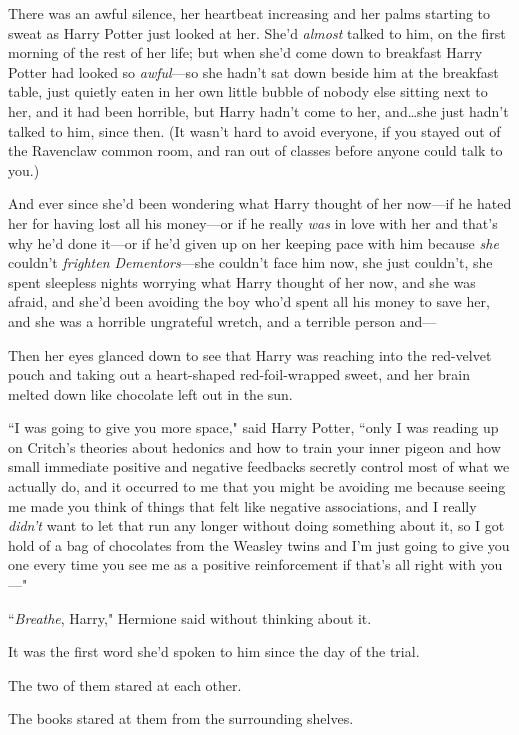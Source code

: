There was an awful silence, her heartbeat increasing and her palms starting to sweat as Harry Potter just looked at her. She'd \emph{almost} talked to him, on the first morning of the rest of her life; but when she'd come down to breakfast Harry Potter had looked so \emph{awful}—so she hadn't sat down beside him at the breakfast table, just quietly eaten in her own little bubble of nobody else sitting next to her, and it had been horrible, but Harry hadn't come to her, and…she just hadn't talked to him, since then. (It wasn't hard to avoid everyone, if you stayed out of the Ravenclaw common room, and ran out of classes before anyone could talk to you.)

And ever since she'd been wondering what Harry thought of her now—if he hated her for having lost all his money—or if he really \emph{was} in love with her and that's why he'd done it—or if he'd given up on her keeping pace with him because \emph{she} couldn't \emph{frighten Dementors}—she couldn't face him now, she just couldn't, she spent sleepless nights worrying what Harry thought of her now, and she was afraid, and she'd been avoiding the boy who'd spent all his money to save her, and she was a horrible ungrateful wretch, and a terrible person and—

Then her eyes glanced down to see that Harry was reaching into the red-velvet pouch and taking out a heart-shaped red-foil-wrapped sweet, and her brain melted down like chocolate left out in the sun.

``I was going to give you more space," said Harry Potter, ``only I was reading up on Critch's theories about hedonics and how to train your inner pigeon and how small immediate positive and negative feedbacks secretly control most of what we actually do, and it occurred to me that you might be avoiding me because seeing me made you think of things that felt like negative associations, and I really \emph{didn't} want to let that run any longer without doing something about it, so I got hold of a bag of chocolates from the Weasley twins and I'm just going to give you one every time you see me as a positive reinforcement if that's all right with you—"

``\emph{Breathe}, Harry," Hermione said without thinking about it.

It was the first word she'd spoken to him since the day of the trial.

The two of them stared at each other.

The books stared at them from the surrounding shelves.

